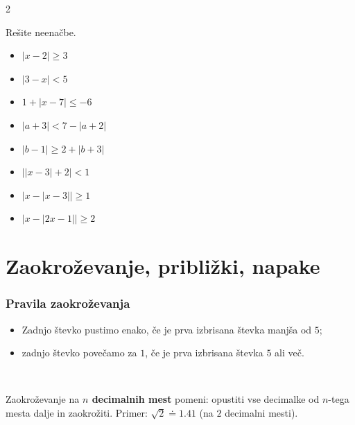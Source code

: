 \begin{multicols}{2}
    
        \begin{naloga}
            Rešite neenačbe.
            \begin{itemize}
                    \item $\left\lvert x-2 \right\rvert \geq 3$ 
                    \item $\left\lvert 3-x\right\rvert <5$ 
                    \item $1+ \left\lvert x-7 \right\rvert \leq-6$ 
                    \item $\left\lvert a+3 \right\rvert < 7- \left\lvert a+2 \right\rvert$ 
                    \item $\left\lvert b-1 \right\rvert \geq 2 + \left\lvert b+3 \right\rvert$ 
                    \item $\left\lvert \lvert x-3\rvert +2\right\rvert <1$ 
                    \item $\left\lvert x- \lvert x-3\rvert \right\rvert \geq 1$ 
                    \item $\left\lvert x- \lvert 2x-1\rvert \right\rvert \geq 2$ 

            \end{itemize}
        \end{naloga}

        
\end{multicols}



    \newpage
\section{Zaokroževanje, približki, napake}

    
        \subsubsection*{Pravila zaokroževanja}
            \begin{itemize}
                \item Zadnjo števko pustimo enako, če je prva izbrisana števka manjša od $5$;
                \item zadnjo števko povečamo za $1$, če je prva izbrisana števka $5$ ali več.
            \end{itemize}
        

            ~~

        
            Zaokroževanje na \textbf{$n$ decimalnih mest} pomeni: 
            opustiti vse decimalke od $n$-tega mesta dalje in zaokrožiti.
            Primer: $\sqrt{2}\doteq 1.41$ (na $2$ decimalni mesti).
        

